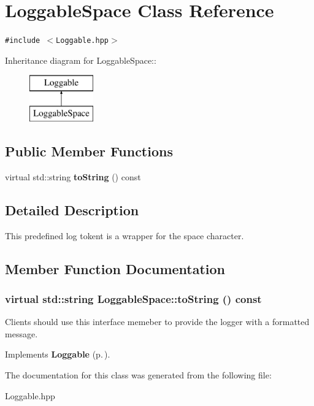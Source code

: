 \section{Loggable\-Space Class Reference}
\label{classLoggableSpace}
{\tt \#include $<$Loggable.hpp$>$}

Inheritance diagram for Loggable\-Space::\begin{figure}[H]
\begin{center}
\leavevmode
\includegraphics[height=2cm]{classLoggableSpace}
\end{center}
\end{figure}
\subsection*{Public Member Functions}
\begin{CompactItemize}
\item 
virtual std::string {\bf to\-String} () const 
\end{CompactItemize}


\subsection{Detailed Description}
This predefined log tokent is a wrapper for the space character.



\subsection{Member Function Documentation}
\subsubsection{\setlength{\rightskip}{0pt plus 5cm}virtual std::string Loggable\-Space::to\-String () const\hspace{0.3cm}{\tt  [inline, virtual]}}\label{classLoggableSpace_a0}


Clients should use this interface memeber to provide the logger with a formatted message.

Implements {\bf Loggable} {\rm (p.\,\pageref{classLoggable_a0})}.

The documentation for this class was generated from the following file:\begin{CompactItemize}
\item 
Loggable.hpp\end{CompactItemize}
